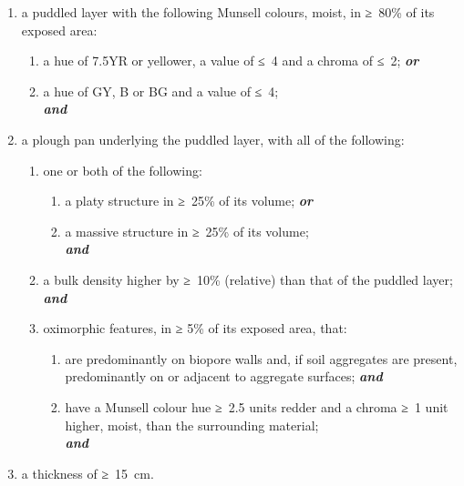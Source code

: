\documentclass[
  letterpaper,
  DIV=11,
  numbers=noendperiod]{scrreprt}
\providecommand{\tightlist}{%
  \setlength{\itemsep}{0pt}\setlength{\parskip}{0pt}}\usepackage{longtable,booktabs,array}
\begin{document}
\begin{enumerate}
\def\labelenumi{\arabic{enumi}.}
\tightlist
\item
  a puddled layer with the following Munsell colours, moist, in ≥~80\%
  of its exposed area:

  \begin{enumerate}
  \def\labelenumii{\alph{enumii}.}
  \tightlist
  \item
    a hue of 7.5YR or yellower, a value of ≤~4 and a chroma of ≤~2;
    \textbf{\emph{or}}
  \item
    a hue of GY, B or BG and a value of ≤~4;\\
    \textbf{\emph{and}}
  \end{enumerate}
\item
  a plough pan underlying the puddled layer, with all of the following:

  \begin{enumerate}
  \def\labelenumii{\alph{enumii}.}
  \tightlist
  \item
    one or both of the following:

    \begin{enumerate}
    \def\labelenumiii{\roman{enumiii}.}
    \tightlist
    \item
      a platy structure in ≥~25\% of its volume; \textbf{\emph{or}}
    \item
      a massive structure in ≥~25\% of its volume;\\
      \textbf{\emph{and}}
    \end{enumerate}
  \item
    a bulk density higher by ≥~10\% (relative) than that of the puddled
    layer;\\
    \textbf{\emph{and}}
  \item
    oximorphic features, in ≥ 5\% of its exposed area, that:

    \begin{enumerate}
    \def\labelenumiii{\roman{enumiii}.}
    \tightlist
    \item
      are predominantly on biopore walls and, if soil aggregates are
      present, predominantly on or adjacent to aggregate surfaces;
      \textbf{\emph{and}}
    \item
      have a Munsell colour hue ≥~2.5 units redder and a chroma ≥~1 unit
      higher, moist, than the surrounding material;\\
      \textbf{\emph{and}}
    \end{enumerate}
  \end{enumerate}
\item
  a thickness of ≥~15~cm.
\end{enumerate}
\end{document}
